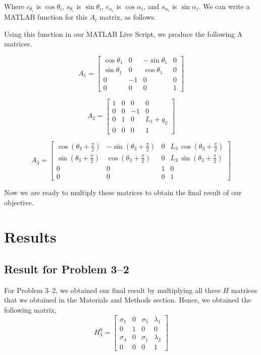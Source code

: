 \documentclass[conference]{IEEEtran}
\begin{document}
Where $c_{\theta_i}$ is $\cos{\theta_i}$, $s_{\theta_i}$ is $\sin{\theta_i}$,
$c_{\alpha_i}$ is $\cos{\alpha_i}$, and $s_{\alpha_i}$ is $\sin{\alpha_i}$.
We can write a MATLAB function for this $A_i$ matrix, as follows.


Using this function in our MATLAB Live Script, we produce the following A matrices.

\[
    A_1 =
    \begin{bmatrix}
        \cos \theta_1 & 0 & -\sin \theta_1 & 0\\
        \sin \theta_1 & 0 & \cos  \theta_1 & 0\\
        0 & -1 & 0 & 0\\
        0 & 0 & 0 & 1
        \end{bmatrix}
\]

\[
    A_2 = 
    \begin{bmatrix}
        1 & 0 & 0 & 0\\
        0 & 0 & -1 & 0\\
        0 & 1 & 0 & L_1 + q_2 \\
        0 & 0 & 0 & 1
        \end{bmatrix}
\]

\[
    A_3 =
    \begin{bmatrix}
        \cos \left(\theta_3 +\frac{\pi }{2}\right) & -\sin \left(\theta_3 +\frac{\pi }{2}\right) & 0 & L_3 \,\cos \left(\theta_3 +\frac{\pi }{2}\right)\\
        \sin \left(\theta_3 +\frac{\pi }{2}\right) & \cos \left(\theta_3 +\frac{\pi }{2}\right) & 0 & L_3 \,\sin \left(\theta_3 +\frac{\pi }{2}\right)\\
        0 & 0 & 1 & 0\\
        0 & 0 & 0 & 1
        \end{bmatrix}
\]

Now we are ready to multiply these matrices to obtain the final result
of our objective.

\section{Results}

\subsection{Result for Problem 3--2}

For Problem 3--2, we obtained our final result by multiplying all three $H$ matrices
that we obtained in the Materials and Methods section. Hence, we obtained the following
matrix,
\[
    H^0_3 =
    \begin{bmatrix}
        \sigma_1  & 0 & \sigma_5  & \lambda_1\\
        0 & 1 & 0 & 0\\
        \sigma_4  & 0 & \sigma_1  & \lambda_2\\
        0 & 0 & 0 & 1
    \end{bmatrix}
\]
\end{document}
